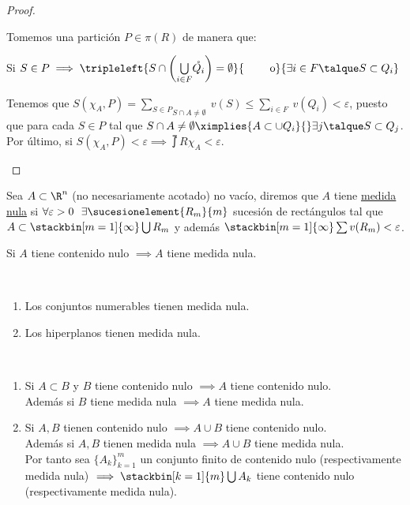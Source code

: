 \begin{teor}
\begin{proof}
\begin{itemize}
	Tomemos una partición $P\in\pi(R)$ de manera que:
	\begin{center}Si $S\in P\implies\tripleleft{S\cap\left(\underset{i\in F}\bigcup\mathring{Q_i}\right)=\emptyset}{\ \ \ \ \ \ \ \mathrm{o}}{\exists i\in F\talque S\subset Q_i}$	\end{center}
	Tenemos que $S(\chi_A,P)=\underset{S\cap A\neq\emptyset}{\underset{S\in P}\sum}\ v(S)\leq \underset{i\in F}\sum\ v(Q_i) < \varepsilon$, puesto que para cada $S\in P$ tal que $S\cap A\neq\emptyset\ximplies{A\subset\cup Q_i}{} \exists j\talque S\subset Q_j$.\\
	Por último, si $S(\chi_A, P)<\varepsilon \implies \upint{}{R}\chi_A<\varepsilon$.
	\end{itemize}
	\end{proof}
	\end{teor}
	
	\begin{defi} Sea $A\subset\R^n$ (no necesariamente acotado) no vacío, diremos que $A$ tiene \underline{medida nula} si $\forall\varepsilon>0 \ \ \exists\sucesionelement{R_m}{m}$ sucesión de rectángulos tal que $A\subset \stackbin[m=1]{\infty}\bigcup R_m$ y además $\stackbin[m=1]{\infty}\sum v(R_m)<\varepsilon$.
	\end{defi}
	
	\begin{observacion} Si $A$ tiene contenido nulo $\implies A$ tiene medida nula.
	\end{observacion}
	
	\begin{ejem}\ 
	\begin{enumerate}[1)]
	\item Los conjuntos numerables tienen medida nula.
	\item Los hiperplanos tienen medida nula.
	\end{enumerate}
	\end{ejem}
	
	\begin{observacion}\ 
	\begin{enumerate}[1)]
	\item Si $A\subset B$ y $B$ tiene contenido nulo $\implies A$ tiene contenido nulo.\\
	Además si $B$ tiene medida nula $\implies A$ tiene medida nula.
	\item Si $A,B$ tienen contenido nulo $\implies A\cup B$ tiene contenido nulo.\\
	Además si $A,B$ tienen medida nula $\implies A\cup B$ tiene medida nula.\\
	Por tanto sea $\{A_k\}_{k=1}^m$ un conjunto finito de contenido nulo (respectivamente medida nula) $\implies \stackbin[k=1]{m}\bigcup A_k$ tiene contenido nulo (respectivamente medida nula).
	\end{enumerate}	 
	\end{observacion}
	
